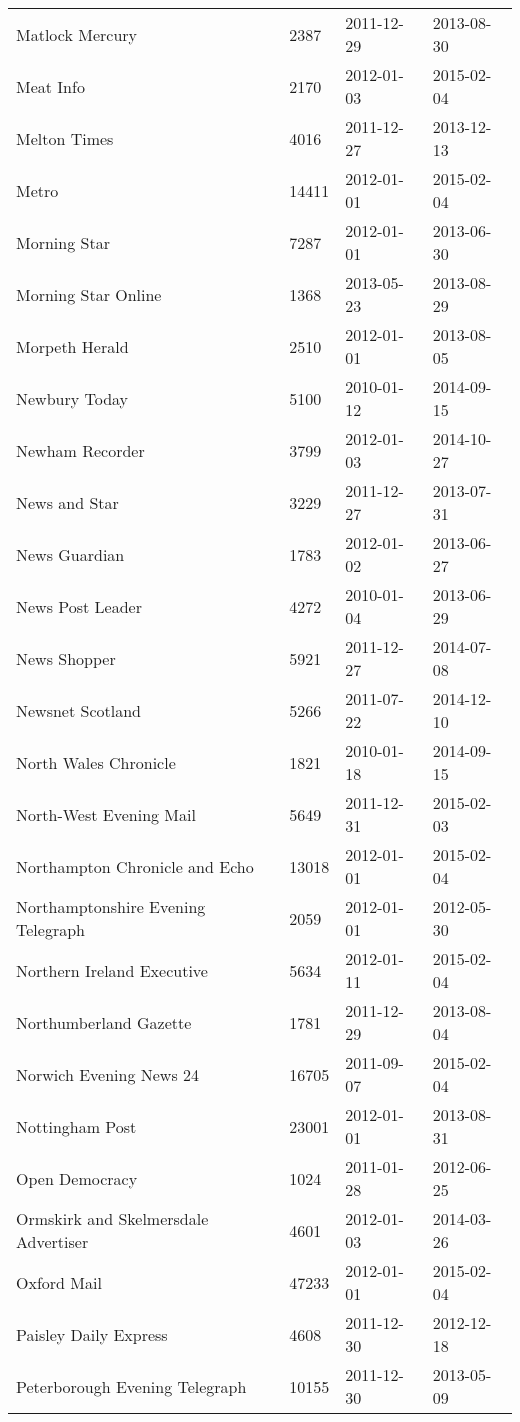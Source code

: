 \begin{longtable}{p{}p{}p{}p{}}
  Matlock Mercury & 2387 & 2011-12-29 & 2013-08-30 \\ 
  Meat Info & 2170 & 2012-01-03 & 2015-02-04 \\ 
  Melton Times & 4016 & 2011-12-27 & 2013-12-13 \\ 
  Metro & 14411 & 2012-01-01 & 2015-02-04 \\ 
  Morning Star & 7287 & 2012-01-01 & 2013-06-30 \\ 
  Morning Star Online & 1368 & 2013-05-23 & 2013-08-29 \\ 
  Morpeth Herald & 2510 & 2012-01-01 & 2013-08-05 \\ 
  Newbury Today & 5100 & 2010-01-12 & 2014-09-15 \\ 
  Newham Recorder & 3799 & 2012-01-03 & 2014-10-27 \\ 
  News and Star & 3229 & 2011-12-27 & 2013-07-31 \\ 
  News Guardian & 1783 & 2012-01-02 & 2013-06-27 \\ 
  News Post Leader & 4272 & 2010-01-04 & 2013-06-29 \\ 
  News Shopper & 5921 & 2011-12-27 & 2014-07-08 \\ 
  Newsnet Scotland & 5266 & 2011-07-22 & 2014-12-10 \\ 
  North Wales Chronicle & 1821 & 2010-01-18 & 2014-09-15 \\ 
  North-West Evening Mail & 5649 & 2011-12-31 & 2015-02-03 \\ 
  Northampton Chronicle and Echo & 13018 & 2012-01-01 & 2015-02-04 \\ 
  Northamptonshire Evening Telegraph & 2059 & 2012-01-01 & 2012-05-30 \\ 
  Northern Ireland Executive & 5634 & 2012-01-11 & 2015-02-04 \\ 
  Northumberland Gazette & 1781 & 2011-12-29 & 2013-08-04 \\ 
  Norwich Evening News 24 & 16705 & 2011-09-07 & 2015-02-04 \\ 
  Nottingham Post & 23001 & 2012-01-01 & 2013-08-31 \\ 
  Open Democracy & 1024 & 2011-01-28 & 2012-06-25 \\ 
  Ormskirk and Skelmersdale Advertiser & 4601 & 2012-01-03 & 2014-03-26 \\ 
  Oxford Mail & 47233 & 2012-01-01 & 2015-02-04 \\ 
  Paisley Daily Express & 4608 & 2011-12-30 & 2012-12-18 \\ 
  Peterborough Evening Telegraph & 10155 & 2011-12-30 & 2013-05-09 \\ 

\end{longtable}

